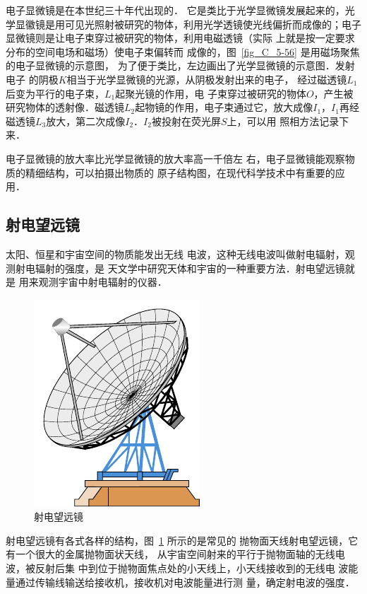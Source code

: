 电子显微镜是在本世纪三十年代出现的．
它是类比于光学显微镜发展起来的，光学显徽镜是用可见光照射被研究的物体，利用光学透镜使光线偏折而成像的；电子
显微镜则是让电子束穿过被研究的物体，利用电磁透镜（实际
上就是按一定要求分布的空间电场和磁场）使电子束偏转而
成像的，图~\ref{fig_C_5-56} 是用磁场聚焦的电子显微镜的示意图，
为了便于类比，左边画出了光学显微镜的示意图．发射电子
的阴极$K$相当于光学显微镜的光源，从阴极发射出来的电子，
经过磁透镜$L_1$后变为平行的电子束，$L_1$起聚光镜的作用，电
子束穿过被研究的物体$O$，产生被研究物体的透射像．磁透镜$L_2$起物镜的作用，电子束通过它，放大成像$I_1$，$I_1$再经磁透镜$L_3$放大，第二次成像$I_2$．$I_2$被投射在荧光屏$S$上，可以用
照相方法记录下来．


电子显微镜的放大率比光学显微镜的放大率高一千倍左
右，电子显微镜能观察物质的精细结构，可以拍摄出物质的
原子结构图，在现代科学技术中有重要的应用．

\subsection*{射电望远镜}
太阳、恒星和宇宙空间的物质能发出无线
电波，这种无线电波叫做射电辐射，观测射电辐射的强度，是
天文学中研究天体和宇宙的一种重要方法．射电望远镜就是
用来观测宇宙中射电辐射的仪器．
\begin{figure}[htbp]
    \centering
    \includegraphics{fig/C/5-57.pdf}
    \caption{射电望远镜}\label{fig_C_5-57}
\end{figure}

射电望远镜有各式各样的结构，图~\ref{fig_C_5-57} 所示的是常见的
抛物面天线射电望远镜，它有一个很大的金属抛物面状天线，
从宇宙空间射来的平行于抛物面轴的无线电波，被反射后集
中到位于抛物面焦点处的小天线上，小天线接收到的无线电
波能量通过传输线输送给接收机，接收机对电波能量进行测
量，确定射电波的强度．

